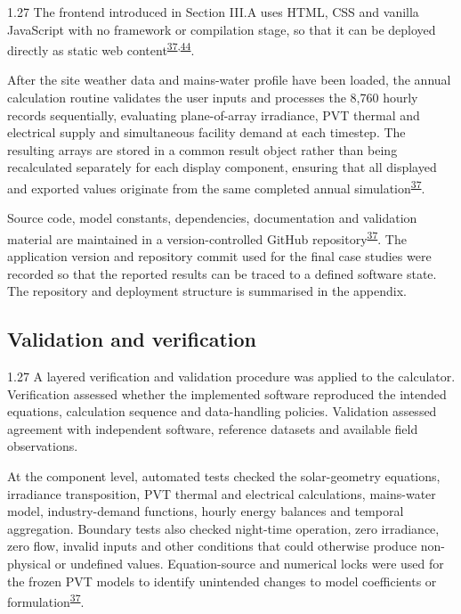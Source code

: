 \documentclass[12pt,letterpaper]{article}
\newcommand{\done}{\ \textcolor{green!45!black}{$\checkmark$}} %
\DeclareRobustCommand{\citenum}[1]{\hyperlink{ref:#1}{#1}} %
\begin{document}
\begin{spacing}{1.27}
The frontend introduced in Section III.A uses HTML, CSS and vanilla JavaScript with no framework or compilation stage, so that it can be deployed directly as static web content\textsuperscript{\citenum{37},\citenum{44}}.\par

\vspace{0.15in}

After the site weather data and mains-water profile have been loaded, the annual calculation routine validates the user inputs and processes the 8,760 hourly records sequentially, evaluating plane-of-array irradiance, PVT thermal and electrical supply and simultaneous facility demand at each timestep. The resulting arrays are stored in a common result object rather than being recalculated separately for each display component, ensuring that all displayed and exported values originate from the same completed annual simulation\textsuperscript{\citenum{37}}.\par

\vspace{0.15in}

Source code, model constants, dependencies, documentation and validation material are maintained in a version-controlled GitHub repository\textsuperscript{\citenum{37}}. The application version and repository commit used for the final case studies were recorded so that the reported results can be traced to a defined software state. The repository and deployment structure is summarised in the appendix.\par
\end{spacing}

\subsection[Validation and verification\done]{Validation and verification}\label{sec34}

\begin{spacing}{1.27}
A layered verification and validation procedure was applied to the calculator. Verification assessed whether the implemented software reproduced the intended equations, calculation sequence and data-handling policies. Validation assessed agreement with independent software, reference datasets and available field observations.\par

\vspace{0.15in}

At the component level, automated tests checked the solar-geometry equations, irradiance transposition, PVT thermal and electrical calculations, mains-water model, industry-demand functions, hourly energy balances and temporal aggregation. Boundary tests also checked night-time operation, zero irradiance, zero flow, invalid inputs and other conditions that could otherwise produce non-physical or undefined values. Equation-source and numerical locks were used for the frozen PVT models to identify unintended changes to model coefficients or formulation\textsuperscript{\citenum{37}}.\par
\end{spacing}
\end{document}
